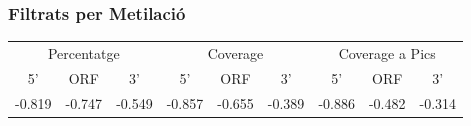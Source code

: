 \documentclass{article}\usepackage[]{graphicx}\usepackage[]{color}
\begin{document}
\subsubsection{Filtrats per Metilació}
\begin{tabular}{ccc|ccc|ccc}
\hline
\multicolumn{3}{c}{Percentatge} &
\multicolumn{3}{c}{Coverage} &
\multicolumn{3}{c}{Coverage a Pics} \\
\cline{1-3}
\cline{4-6}
\cline{7-9}
5' & ORF & 3' & 5' & ORF & 3' & 5' & ORF & 3' \\
\hline
-0.819 & -0.747 & -0.549 &
-0.857 & -0.655 & -0.389 &
-0.886 & -0.482 & -0.314\\
\hline
\end{tabular} \\\\
\end{document}
